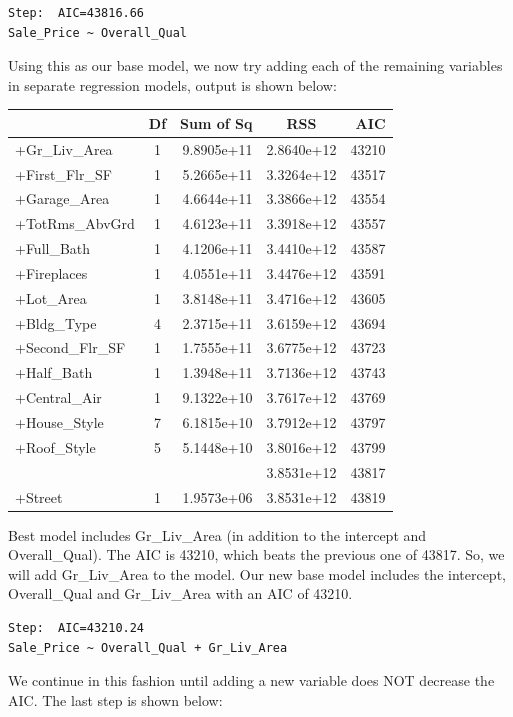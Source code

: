 \documentclass[
  letterpaper,
  DIV=11,
  numbers=noendperiod]{scrreprt}
\begin{document}
\begin{verbatim}
Step:  AIC=43816.66
Sale_Price ~ Overall_Qual
\end{verbatim}

Using this as our base model, we now try adding each of the remaining
variables in separate regression models, output is shown below:

\begin{longtable}[]{@{}lcrcr@{}}
\toprule()
& Df & Sum of Sq & RSS & AIC \\
\midrule()
\endhead
+Gr\_Liv\_Area & 1 & 9.8905e+11 & 2.8640e+12 & 43210 \\
+First\_Flr\_SF & 1 & 5.2665e+11 & 3.3264e+12 & 43517 \\
+Garage\_Area & 1 & 4.6644e+11 & 3.3866e+12 & 43554 \\
+TotRms\_AbvGrd & 1 & 4.6123e+11 & 3.3918e+12 & 43557 \\
+Full\_Bath & 1 & 4.1206e+11 & 3.4410e+12 & 43587 \\
+Fireplaces & 1 & 4.0551e+11 & 3.4476e+12 & 43591 \\
+Lot\_Area & 1 & 3.8148e+11 & 3.4716e+12 & 43605 \\
+Bldg\_Type & 4 & 2.3715e+11 & 3.6159e+12 & 43694 \\
+Second\_Flr\_SF & 1 & 1.7555e+11 & 3.6775e+12 & 43723 \\
+Half\_Bath & 1 & 1.3948e+11 & 3.7136e+12 & 43743 \\
+Central\_Air & 1 & 9.1322e+10 & 3.7617e+12 & 43769 \\
+House\_Style & 7 & 6.1815e+10 & 3.7912e+12 & 43797 \\
+Roof\_Style & 5 & 5.1448e+10 & 3.8016e+12 & 43799 \\
& & & 3.8531e+12 & 43817 \\
+Street & 1 & 1.9573e+06 & 3.8531e+12 & 43819 \\
\bottomrule()
\end{longtable}

Best model includes Gr\_Liv\_Area (in addition to the intercept and
Overall\_Qual). The AIC is 43210, which beats the previous one of 43817.
So, we will add Gr\_Liv\_Area to the model. Our new base model includes
the intercept, Overall\_Qual and Gr\_Liv\_Area with an AIC of 43210.

\begin{verbatim}
Step:  AIC=43210.24
Sale_Price ~ Overall_Qual + Gr_Liv_Area
\end{verbatim}

We continue in this fashion until adding a new variable does NOT
decrease the AIC. The last step is shown below:
\end{document}
